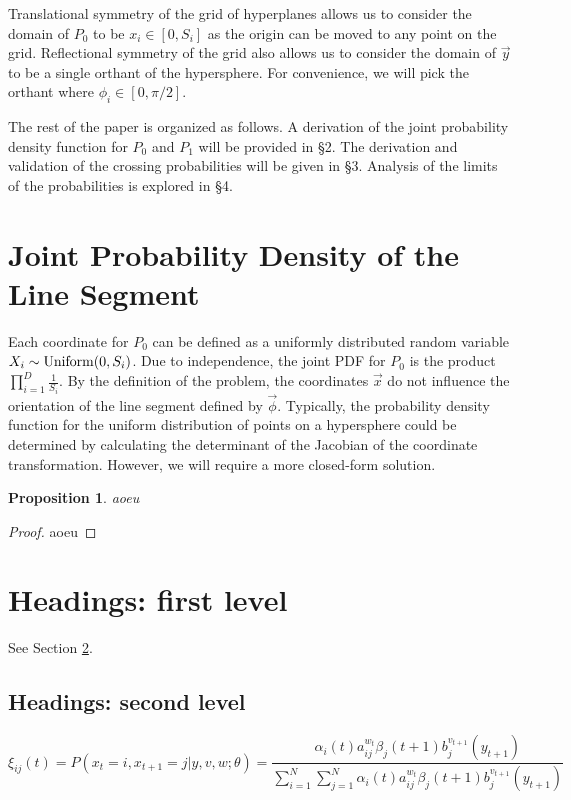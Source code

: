 \documentclass{article}
\newtheorem{proposition}{Proposition}
\begin{document}
Translational symmetry of the grid of hyperplanes allows us to consider the domain of $P_0$ to be $x_i\in[0,S_i]$ as the origin can be moved to any point on the grid.
Reflectional symmetry of the grid also allows us to consider the domain of $\vec{y}$ to be a single orthant of the hypersphere. For convenience, we will pick the orthant where
$\phi_i \in [0, \pi/2]$.

The rest of the paper is organized as follows. A derivation of the joint probability density function for $P_0$ and $P_1$ will be provided in \S 2. The derivation and validation
of the crossing probabilities will be given in \S 3. Analysis of the limits of the probabilities is explored in \S 4.

\section{Joint Probability Density of the Line Segment}
Each coordinate for $P_0$ can be defined as a uniformly distributed random variable $X_i\sim{\rm Uniform}(0,S_i)$. Due to independence, the joint PDF for $P_0$ is the product
$\prod_{i=1}^D \frac{1}{S_i}$. By the definition of the problem, the coordinates $\vec{x}$ do not influence the orientation of the line segment defined by $\vec{\phi}$. 
Typically, the probability density function for the uniform distribution of points on a hypersphere could be determined by calculating the determinant of the Jacobian of
the coordinate transformation. However, we will require a more closed-form solution. 

\begin{proposition}
aoeu
\end{proposition}
\begin{proof}
	aoeu
\end{proof}



\section{Headings: first level}
\label{sec:headings}

\lipsum[4] See Section \ref{sec:headings}.

\subsection{Headings: second level}
\lipsum[5]
\begin{equation}
	\xi _{ij}(t)=P(x_{t}=i,x_{t+1}=j|y,v,w;\theta)= {\frac {\alpha _{i}(t)a^{w_t}_{ij}\beta _{j}(t+1)b^{v_{t+1}}_{j}(y_{t+1})}{\sum _{i=1}^{N} \sum _{j=1}^{N} \alpha _{i}(t)a^{w_t}_{ij}\beta _{j}(t+1)b^{v_{t+1}}_{j}(y_{t+1})}}
\end{equation}
\end{document}
